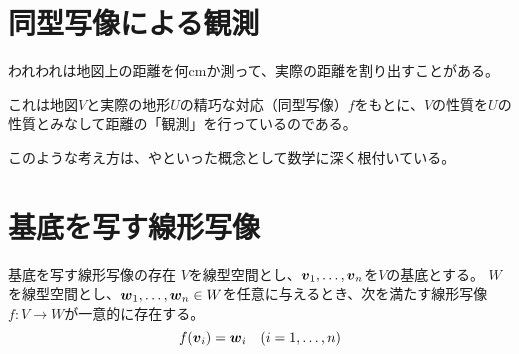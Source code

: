 \documentclass[../../../topic_linear-algebra]{subfiles}
\begin{document}
\sectionline
\section{同型写像による観測}

われわれは地図上の距離を何cmか測って、実際の距離を割り出すことがある。

これは地図$V$と実際の地形$U$の精巧な対応（同型写像）$f$をもとに、$V$の性質を$U$の性質とみなして距離の「観測」を行っているのである。

\br

このような考え方は、やといった概念として数学に深く根付いている。

\sectionline
\section{基底を写す線形写像}

\begin{theorem*}{基底を写す線形写像の存在}
  $V$を線型空間とし、$\vb*{v}_1, \ldots, \vb*{v}_n$を$V$の基底とする。
  $W$を線型空間とし、$\vb*{w}_1, \ldots, \vb*{w}_n \in W$を任意に与えるとき、次を満たす線形写像$f\colon V \to W$が一意的に存在する。
  \begin{equation*}
    f(\vb*{v}_i) = \vb*{w}_i \quad (i = 1, \ldots, n)
  \end{equation*}
\end{theorem*}
\end{document}
